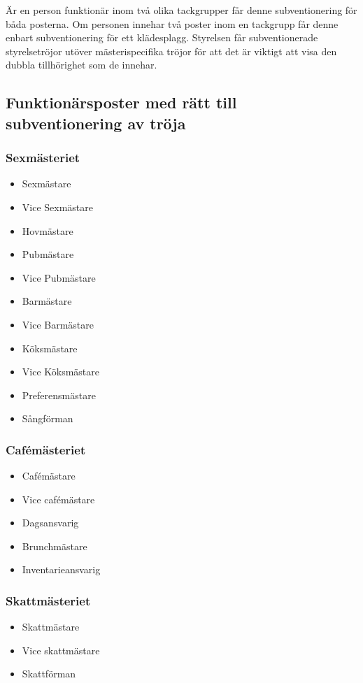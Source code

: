 \documentclass{dsekprotokoll}
\begin{document}
\par Är en person funktionär inom två olika tackgrupper får denne subventionering för båda posterna. Om personen innehar två poster inom en tackgrupp får denne enbart subventionering för ett klädesplagg. Styrelsen får subventionerade styrelsetröjor utöver mästerispecifika tröjor för att det är viktigt att visa den dubbla tillhörighet som de innehar.

\subsection{Funktionärsposter med rätt till subventionering av tröja}
\begin{multicols}{2}
  \subsubsection*{Sexmästeriet}
  \begin{itemize}
    \item Sexmästare
    \item Vice Sexmästare
    \item Hovmästare
    \item Pubmästare
    \item Vice Pubmästare
    \item Barmästare
    \item Vice Barmästare
    \item Köksmästare
    \item Vice Köksmästare
    \item Preferensmästare
    \item Sångförman
  \end{itemize}
  \subsubsection*{Cafémästeriet}
  \begin{itemize}
    \item Cafémästare
    \item Vice cafémästare
    \item Dagsansvarig
    \item Brunchmästare
    \item Inventarieansvarig
  \end{itemize}
  \subsubsection*{Skattmästeriet}
  \begin{itemize}
    \item Skattmästare
    \item Vice skattmästare
    \item Skattförman
  \end{itemize}

\end{multicols}
\end{document}
